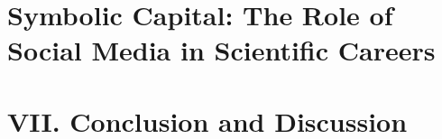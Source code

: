 \documentclass[draft,final]{vutinfth} %
\begin{document}
\chapter{Symbolic Capital: The Role of Social Media in Scientific Careers}
\chapter{VII. Conclusion and Discussion}

\backmatter

\listoffigures %

\cleardoublepage %
\listoftables %


\printindex

\printglossaries



\end{document}

